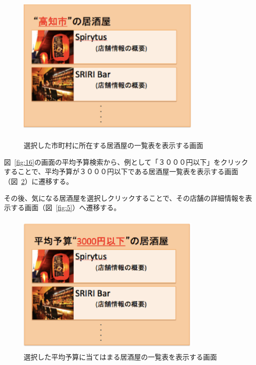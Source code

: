 \documentclass[a4j,titlepage]{jarticle}
\begin{document}
\begin {figure}[!htbp]
    \begin{center}
    \includegraphics [height=7cm, width=9cm]{17.eps}
　　    \caption {選択した市町村に所在する居酒屋の一覧表を表示する画面}
    \label {fig:17}
    \end{center}
\end {figure}



図~\ref{fig:16}の画面の平均予算検索から、例として「３０００円以下」をクリックすることで、平均予算が３０００円以下である居酒屋一覧表を表示する画面（図~\ref{fig:18}）に遷移する。



その後、気になる居酒屋を選択しクリックすることで、その店舗の詳細情報を表示する画面（図~\ref{fig:5}）へ遷移する。


\begin {figure}[!htbp]
    \begin{center}
    \includegraphics [height=7cm, width=9cm]{18.eps}
    \caption {選択した平均予算に当てはまる居酒屋の一覧表を表示する画面}
    \label {fig:18}
    \end{center}
\end {figure}
\end{document}
